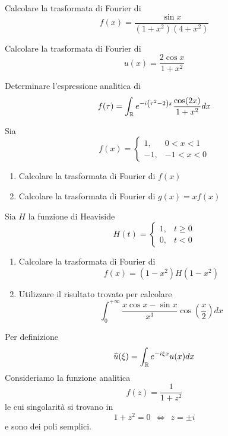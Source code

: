 Calcolare la trasformata di Fourier di
\begin{equation*}
f( x) =\frac{\sin x}{\left( 1+x^{2}\right)\left( 4+x^{2}\right)}
\end{equation*}
\Esercizio{}

Calcolare la trasformata di Fourier di\begin{equation*}
u( x) =\frac{2\cos x}{1+x^{2}}
\end{equation*}
\Esercizio{}

Determinare l'espressione analitica di
\begin{equation*}
f( \tau ) =\int _{\mathbb{R} } e^{-i\left( \tau ^{2} -2\right) x}\frac{\cos( 2x)}{1+x^{2}} dx
\end{equation*}
\Esercizio{}

Sia
\begin{equation*}
f( x) =\begin{cases}
1, & 0< x< 1\\
-1, & -1< x< 0
\end{cases}
\end{equation*}
\begin{enumerate}
\item Calcolare la trasformata di Fourier di $f( x)$
\item Calcolare la trasformata di Fourier di $g( x) =xf( x)$
\end{enumerate}
\Esercizio{}

Sia $H$ la funzione di Heaviside
\begin{equation*}
H( t) =\begin{cases}
1, & t\geqslant 0\\
0, & t< 0
\end{cases}
\end{equation*}
\begin{enumerate}
\item Calcolare la trasformata di Fourier di\begin{equation*}
f( x) =\left( 1-x^{2}\right) H\left( 1-x^{2}\right)
\end{equation*}
\item Utilizzare il risultato trovato per calcolare\begin{equation*}
\int ^{+\infty }_{0}\frac{x\cos x-\sin x}{x^{3}}\cos\left(\frac{x}{2}\right) dx
\end{equation*}
\end{enumerate}
\ParteSoluzioni
\Soluzione

Per definizione
\begin{equation*}
\widehat{u}( \xi ) =\int _{\mathbb{R} } e^{-i\xi x} u( x) dx
\end{equation*}
Consideriamo la funzione analitica
\begin{equation*}
f( z) =\frac{1}{1+z^{2}}
\end{equation*}
le cui singolarità si trovano in
\begin{equation*}
1+z^{2} =0\ \ \iff \ \ z=\pm i
\end{equation*}
e sono dei poli semplici.


